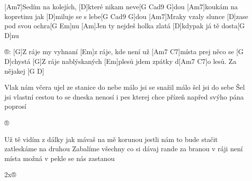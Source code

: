 
[Am7]Sedím na kolejích, [D]které nikam neve[G Cad9 G]dou
[Am7]koukám na kopretinu jak [D]miluje se s lebe[G Cad9 G]dou
[Am7]Mraky vzaly slunce [D]zase pod svou ochra[G Em]nu
[Am]Jen ty nejdeš holka zlatá [D]kdypak já tě dosta[G D]nu

®: [G]Z ráje my vyhnaní [Em]z ráje, kde není
už [Am7 C7]místa prej něco se [G D]chystá
[G]Z ráje nablýskaných [Em]plesů jdem zpátky
d[Am7 C7]o lesů. Za nějakej [G D]

Vlak nám včera ujel ze stanice do nebe
málo jsi se snažil málo šel jsi do sebe
Šel jsi vlastní cestou to se dneska nenosí
i pes kterej chce přízeň napřed svýho pána poprosí

®

Už tě vidím z dálky jak mávaš na mě korunou
jestli nám to bude stačit zatleskáme na druhou
Zabalíme všechny co si dávaj rande za branou
v ráji není místa možná v pekle se nás zastanou

2x®